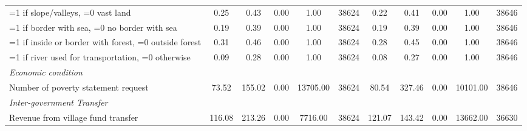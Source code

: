 \begin{tabular}{l*{2}{ccccc}}
\hspace{0.25cm} =1 if slope/valleys, =0 vast land&     0.25&     0.43&     0.00&     1.00&    38624&     0.22&     0.41&     0.00&     1.00&    38646\\
\hspace{0.25cm} =1 if border with sea, =0 no border with sea&     0.19&     0.39&     0.00&     1.00&    38624&     0.19&     0.39&     0.00&     1.00&    38646\\
\hspace{0.25cm} =1 if inside or border with forest, =0 outside forest&     0.31&     0.46&     0.00&     1.00&    38624&     0.28&     0.45&     0.00&     1.00&    38646\\
\hspace{0.25cm} =1 if river used for transportation, =0 otherwise&     0.09&     0.28&     0.00&     1.00&    38624&     0.08&     0.27&     0.00&     1.00&    38646\\
\emph{Economic condition}&         &         &         &         &         &         &         &         &         &         \\
\hspace{0.25cm} Number of poverty statement request&    73.52&   155.02&     0.00& 13705.00&    38624&    80.54&   327.46&     0.00& 10101.00&    38646\\
\emph{Inter-government Transfer}&         &         &         &         &         &         &         &         &         &         \\
\hspace{0.25cm} Revenue from village fund transfer&   116.08&   213.26&     0.00&  7716.00&    38624&   121.07&   143.42&     0.00& 13662.00&    36630\\
\bottomrule
\end{tabular}
